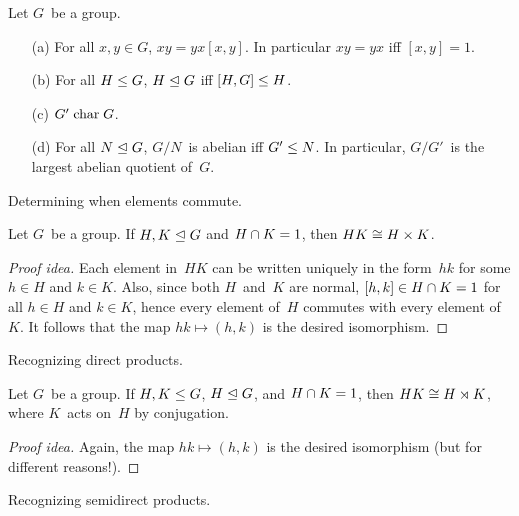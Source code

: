 \begin{thm}[Commutators]
Let \(G\)~be a group.
\begin{enumerate}[itemsep=0pt]
\item[(a)] For all \(x,y\in G\), \(xy=yx[x,y]\). In particular \(xy=yx\) iff \([x,y]=1\).
\item[(b)] For all \(H\le G\), \(H\trianglelefteq G\) iff \([H,G]\le H\).
\item[(c)] \(G'\mathrel{\mathrm{char}} G\).
\item[(d)] For all \(N\trianglelefteq G\), \(G/N\)~is abelian iff \(G'\le N\). In particular, \(G/G'\)~is the largest abelian quotient of~\(G\).
\end{enumerate}
\end{thm}
\begin{app}
Determining when elements commute.
\end{app}

\begin{thm}
Let \(G\)~be a group. If \(H,K\trianglelefteq G\) and \(H\cap K=1\), then \(HK\cong H\times K\).
\end{thm}
\begin{proof}[Proof idea]
Each element in~\(HK\) can be written uniquely in the form~\(hk\) for some \(h\in H\) and \(k\in K\). Also, since both \(H\)~and~\(K\) are normal, \([h,k]\in H\cap K=1\) for all \(h\in H\) and \(k\in K\), hence every element of~\(H\) commutes with every element of~\(K\). It follows that the map \(hk\mapsto (h,k)\) is the desired isomorphism.
\end{proof}
\begin{app}
Recognizing direct products.
\end{app}

\begin{thm}
Let \(G\)~be a group. If \(H,K\le G\), \(H\trianglelefteq G\), and \(H\cap K=1\), then \(HK\cong H\rtimes K\), where \(K\)~acts on~\(H\) by conjugation.
\end{thm}
\begin{proof}[Proof idea]
Again, the map \(hk\mapsto (h,k)\) is the desired isomorphism (but for different reasons!).
\end{proof}
\begin{app}
Recognizing semidirect products.
\end{app}

